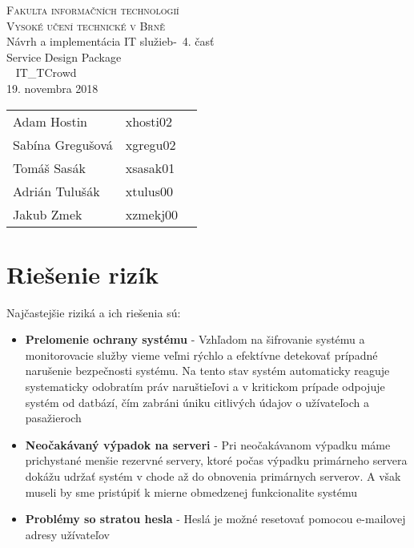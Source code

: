\documentclass[a4paper, 11pt]{article}
\begin{document}
\begin{center}
\Huge
\textsc{Fakulta informačních technologií\\
Vysoké učení technické v Brně}
\\[84mm]
\LARGE Návrh a implementácia IT služieb\--\ 4. časť\\
\Huge Service Design Package \\\
\vspace{3.5cm}
\LARGE IT\_TCrowd\\
\Large 19. novembra 2018
\end{center}

\hfill

\begin{minipage}[l]{0.6 \textwidth}
\Large
\begin{tabular}{l l l}
Adam Hostin  & xhosti02\\
Sabína Gregušová & xgregu02\\
Tomáš Sasák & xsasak01 \\
Adrián Tulušák  & xtulus00 \\
Jakub Zmek & xzmekj00 \\
\end{tabular}
\end{minipage}
\thispagestyle{empty}
\clearpage

\setcounter{page}{1}

\section{Riešenie rizík}
Najčastejšie riziká a ich riešenia sú:

\begin{itemize}
\item \textbf{Prelomenie ochrany systému} - Vzhľadom na šifrovanie systému a monitorovacie služby vieme veľmi rýchlo a efektívne detekovať prípadné narušenie bezpečnosti systému. Na tento stav systém automaticky reaguje systematicky odobratím práv naruštieľovi  a v kritickom prípade odpojuje systém od datbází, čím zabráni úniku citlivých údajov o užívateľoch a pasažieroch
\item \textbf{Neočakávaný výpadok na serveri} - Pri neočakávanom výpadku máme prichystané menšie rezervné servery, ktoré počas výpadku primárneho servera dokážu udržať systém v chode až do obnovenia primárnych serverov. A však museli by sme pristúpiť k mierne obmedzenej funkcionalite systému
\item \textbf{Problémy so stratou hesla} - Heslá je možné resetovať pomocou e-mailovej adresy užívateľov
\end{itemize}
\end{document}
